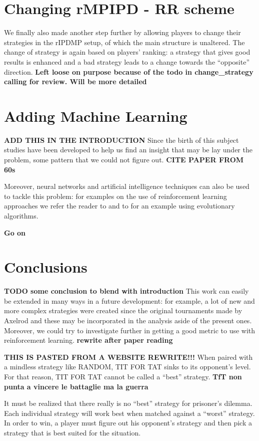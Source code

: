 \documentclass[journal,a4paper,10pt,twoside]{IEEEtran} %
\begin{document}
\section{Changing rMPIPD - RR scheme} \label{s:crIPDMP}
We finally also made another step further by allowing players to change their strategies in the rIPDMP setup, of which the main structure is unaltered. The change of strategy is again based on players' ranking: a strategy that gives good results is enhanced and a bad strategy leads to a change towards the ``opposite'' direction.
\textbf{Left loose on purpose because of the todo in change_strategy calling for review. Will be more detailed}

\section{Adding Machine Learning}
\textbf{ADD THIS IN THE INTRODUCTION}
Since the birth of this subject studies have been developed to help us find an insight that may be lay under the problem, some pattern that we could not figure out. \textbf{CITE PAPER FROM 60s}

Moreover, neural networks and artificial intelligence techniques can also be used to tackle this problem: for examples on the use of reinforcement learning approaches we refer the reader to \cite{sandholmRL,plosRLdominant,coopSeqRL,kedaoRL} and to \cite{shashiEvoAlg} for an example using evolutionary algorithms.

\textbf{Go on}


\section{Conclusions} \label{s:conc}
\textbf{TODO some conclusion to blend with introduction}
This work can easily be extended in many ways in a future development: for example, a lot of new and more complex strategies were created since the original tournaments made by Axelrod and these may be incorporated in the analysis aside of the present ones.
Moreover, we could try to investigate further in getting a good metric to use with reinforcement learning. \textbf{rewrite after paper reading}

\textbf{THIS IS PASTED FROM A WEBSITE REWRITE!!!}
When paired with a mindless strategy like RANDOM, TIT FOR TAT sinks to its opponent's level. For that reason, TIT FOR TAT cannot be called a ``best'' strategy.
\textbf{TfT non punta a vincere le battaglie ma la guerra}

It must be realized that there really is no ``best'' strategy for prisoner's dilemma. Each individual strategy will work best when matched against a ``worst'' strategy. In order to win, a player must figure out his opponent's strategy and then pick a strategy that is best suited for the situation.

\balance


\end{document}
